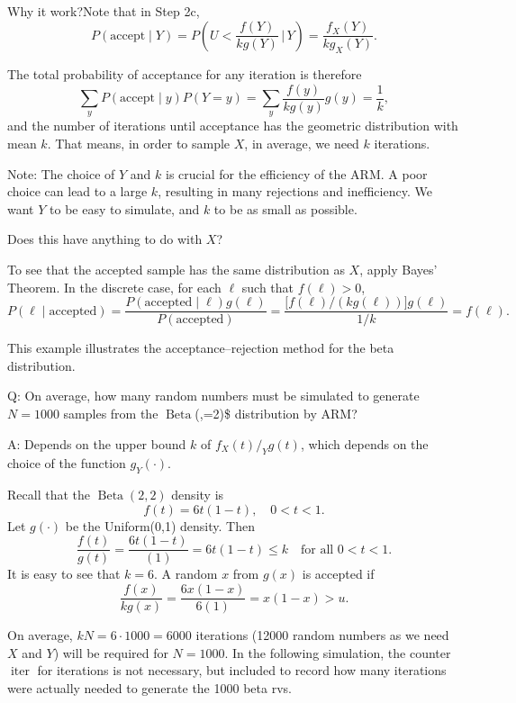 \documentclass[
  letterpaper,
  DIV=11,
  numbers=noendperiod]{scrreprt}
\begin{document}
Why it work?Note that in Step 2c, \[
P(\text{accept} \mid Y) 
= P\!\left(U < \frac{f(Y)}{k g(Y)} \,\Big|\, Y\right) 
= \frac{f_X(Y)}{k g_X(Y)}.
\]

The total probability of acceptance for any iteration is therefore \[
\sum_y P(\text{accept} \mid y) P(Y = y) 
= \sum_y \frac{f(y)}{k g(y)} g(y) 
= \frac{1}{k},
\] and the number of iterations until acceptance has the geometric
distribution with mean \(k\). That means, in order to sample \(X\), in
average, we need \(k\) iterations.

Note: The choice of \(Y\) and \(k\) is crucial for the efficiency of the
ARM. A poor choice can lead to a large \(k\), resulting in many
rejections and inefficiency. We want \(Y\) to be easy to simulate, and
\(k\) to be as small as possible.

Does this have anything to do with \(X\)?

To see that the accepted sample has the same distribution as \(X\),
apply Bayes' Theorem. In the discrete case, for each \(\ell\) such that
\(f(\ell) > 0\), \[
P(\ell \mid \text{accepted}) 
= \frac{P(\text{accepted} \mid \ell) g(\ell)}{P(\text{accepted})} 
= \frac{\big[f(\ell)/(k g(\ell))\big] g(\ell)}{1/k} 
= f(\ell).
\]

This example illustrates the acceptance--rejection method for the beta
distribution.

Q: On average, how many random numbers must be simulated to generate
\(N=1000\) samples from the
\(\operatorname{Beta}\)(,=2)\$ distribution
by ARM?

A: Depends on the upper bound \(k\) of \(f_X(t)/_Yg(t)\), which depends
on the choice of the function \(g_Y(\cdot)\).

Recall that the \(\operatorname{Beta}(2,2)\) density is \[
f(t) = 6t(1-t), \quad 0 < t < 1.
\] Let \(g(\cdot)\) be the Uniform(0,1) density. Then \[
\frac{f(t)}{g(t)} = \frac{6t(1-t)}{(1)} = 6t(1-t) \leq k \quad \text{for all } 0 < t < 1.
\] It is easy to see that \(k = 6\). A random \(x\) from \(g(x)\) is
accepted if \[
\frac{f(x)}{kg(x)} = \frac{6x(1-x)}{6(1)} = x(1-x) > u.
\]

On average, \(kN = 6\cdot 1000 =6000\) iterations (12000 random numbers
as we need \(X\) and \(Y\)) will be required for \(N=1000\). In the
following simulation, the counter \(\operatorname{iter}\) for iterations
is not necessary, but included to record how many iterations were
actually needed to generate the 1000 beta rvs.
\end{document}
